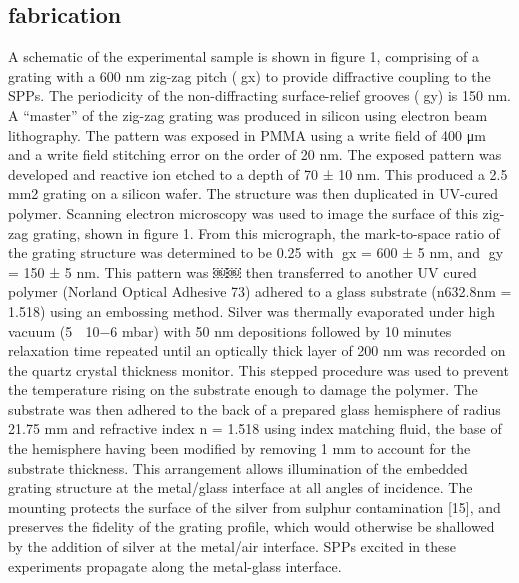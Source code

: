 \documentclass[oneside,11pt,book]{book}
\begin{document}
\subsection{fabrication}
A schematic of the experimental sample is shown in figure 1, comprising of a grating with a 600 nm zig-zag pitch (gx) to provide diffractive coupling to the SPPs. The periodicity of the non-diffracting surface-relief grooves (gy) is 150 nm.
A “master” of the zig-zag grating was produced in silicon using electron beam lithography. The pattern was exposed in PMMA using a write field of 400 μm and a write field stitching error on the order of 20 nm. The exposed pattern was developed and reactive ion etched to a depth of 70 ± 10 nm. This produced a 2.5 mm2 grating on a silicon wafer. The structure was then duplicated in UV-cured polymer. Scanning electron microscopy was used to image the surface of this zig-zag grating, shown in figure 1. From this micrograph, the mark-to-space ratio of the grating structure was determined to be 0.25 with gx = 600 ± 5 nm, and gy = 150 ± 5 nm. This pattern was
￼￼
then transferred to another UV cured polymer (Norland Optical Adhesive 73) adhered to a glass substrate (n632.8nm = 1.518) using an embossing method.
Silver was thermally evaporated under high vacuum (5  10−6 mbar) with 50 nm depositions followed by 10 minutes relaxation time repeated until an optically thick layer of 200 nm was recorded on the quartz crystal thickness monitor. This stepped procedure was used to prevent the temperature rising on the substrate enough to damage the polymer.
The substrate was then adhered to the back of a prepared glass hemisphere of radius 21.75 mm and refractive index n = 1.518 using index matching fluid, the base of the hemisphere having been modified by removing 1 mm to account for the substrate thickness. This arrangement allows illumination of the embedded grating structure at the metal/glass interface at all angles of incidence. The mounting protects the surface of the silver from sulphur contamination [15], and preserves the fidelity of the grating profile, which would otherwise be shallowed by the addition of silver at the metal/air interface. SPPs excited in these experiments propagate along the metal-glass interface.
\end{document}
